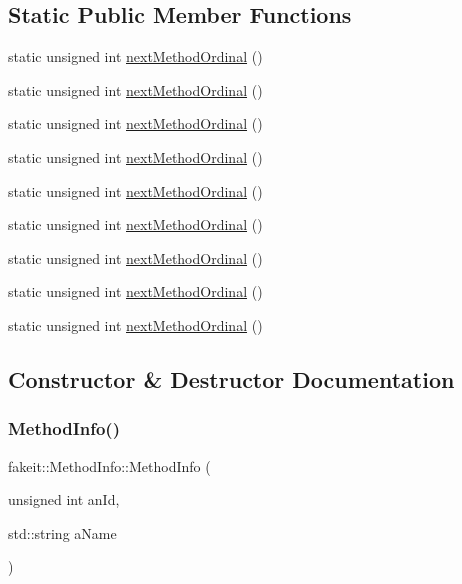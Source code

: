 \subsection*{Static Public Member Functions}
\begin{DoxyCompactItemize}
\item 
static unsigned int \mbox{\hyperlink{structfakeit_1_1MethodInfo_a751eb2c61420418115bda68345258c8c}{next\+Method\+Ordinal}} ()
\item 
static unsigned int \mbox{\hyperlink{structfakeit_1_1MethodInfo_a751eb2c61420418115bda68345258c8c}{next\+Method\+Ordinal}} ()
\item 
static unsigned int \mbox{\hyperlink{structfakeit_1_1MethodInfo_a751eb2c61420418115bda68345258c8c}{next\+Method\+Ordinal}} ()
\item 
static unsigned int \mbox{\hyperlink{structfakeit_1_1MethodInfo_a751eb2c61420418115bda68345258c8c}{next\+Method\+Ordinal}} ()
\item 
static unsigned int \mbox{\hyperlink{structfakeit_1_1MethodInfo_a751eb2c61420418115bda68345258c8c}{next\+Method\+Ordinal}} ()
\item 
static unsigned int \mbox{\hyperlink{structfakeit_1_1MethodInfo_a751eb2c61420418115bda68345258c8c}{next\+Method\+Ordinal}} ()
\item 
static unsigned int \mbox{\hyperlink{structfakeit_1_1MethodInfo_a751eb2c61420418115bda68345258c8c}{next\+Method\+Ordinal}} ()
\item 
static unsigned int \mbox{\hyperlink{structfakeit_1_1MethodInfo_a751eb2c61420418115bda68345258c8c}{next\+Method\+Ordinal}} ()
\item 
static unsigned int \mbox{\hyperlink{structfakeit_1_1MethodInfo_a751eb2c61420418115bda68345258c8c}{next\+Method\+Ordinal}} ()
\end{DoxyCompactItemize}


\subsection{Constructor \& Destructor Documentation}
\mbox{\label{structfakeit_1_1MethodInfo_a55bde4b21f0b316f2f01d7e76cee5890}} 
\subsubsection{\texorpdfstring{MethodInfo()}{MethodInfo()}\hspace{0.1cm}{\footnotesize\ttfamily [1/9]}}
{\footnotesize\ttfamily fakeit\+::\+Method\+Info\+::\+Method\+Info (\begin{DoxyParamCaption}\item[{unsigned int}]{an\+Id,  }\item[{std\+::string}]{a\+Name }\end{DoxyParamCaption})\hspace{0.3cm}{\ttfamily [inline]}}

